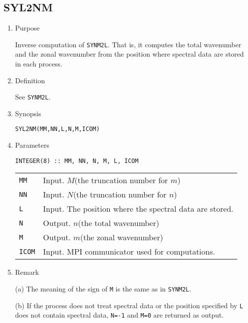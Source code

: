 \documentclass[a4paper]{scrartcl}
\begin{document}

\subsection{SYL2NM}

\begin{enumerate}

\item Purpose

Inverse computation of \texttt{SYNM2L}.
That is, 
it computes 
the total wavenumber and the zonal wavenumber from
the position where spectral data are stored in each process.

\item Definition

See \texttt{SYNM2L}.

\item Synopsis 
    
\texttt{SYL2NM(MM,NN,L,N,M,ICOM)}
  
\item Parameters

\begin{verbatim}
INTEGER(8) :: MM, NN, N, M, L, ICOM
\end{verbatim}    

\begin{tabular}{ll}
\texttt{MM} & Input. $M$(the truncation number for $m$)\\
\texttt{NN} & Input. $N$(the truncation number for $n$)\\
\texttt{L} & Input. The position where the spectral
data are stored.\\
\texttt{N} & Output. $n$(the total wavenumber)\\
\texttt{M} & Output. $m$(the zonal wavenumber)\\
\texttt{ICOM} & Input. MPI communicator used for computations.
\end{tabular}

\item Remark

(a) The meaning of the sign of \texttt{M} is the same as in \texttt{SYNM2L}.

(b) If the process does not treat spectral data or the 
  position specified by \texttt{L} does not contain 
  spectral data, \texttt{N=-1} and \texttt{M=0} are returned 
  as output.

\end{enumerate}
\end{document}
